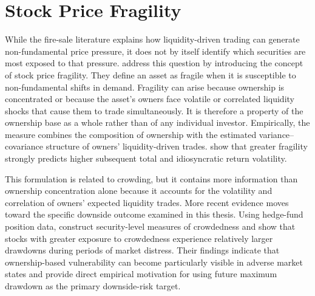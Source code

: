 \section{Stock Price Fragility}
\label{sec:stock_price_fragility}

While the fire-sale literature explains how liquidity-driven trading can generate non-fundamental price pressure, it does not by itself identify which securities are most exposed to that pressure. \textcite{greenwood2011stock} address this question by introducing the concept of stock price fragility. They define an asset as fragile when it is susceptible to non-fundamental shifts in demand. Fragility can arise because ownership is concentrated or because the asset's owners face volatile or correlated liquidity shocks that cause them to trade simultaneously. It is therefore a property of the ownership base as a whole rather than of any individual investor. Empirically, the measure combines the composition of ownership with the estimated variance--covariance structure of owners' liquidity-driven trades. \textcite{greenwood2011stock} show that greater fragility strongly predicts higher subsequent total and idiosyncratic return volatility.

This formulation is related to crowding, but it contains more information than ownership concentration alone because it accounts for the volatility and correlation of owners' expected liquidity trades. More recent evidence moves toward the specific downside outcome examined in this thesis. Using hedge-fund position data, \textcite{brown2022crowded} construct security-level measures of crowdedness and show that stocks with greater exposure to crowdedness experience relatively larger drawdowns during periods of market distress. Their findings indicate that ownership-based vulnerability can become particularly visible in adverse market states and provide direct empirical motivation for using future maximum drawdown as the primary downside-risk target.